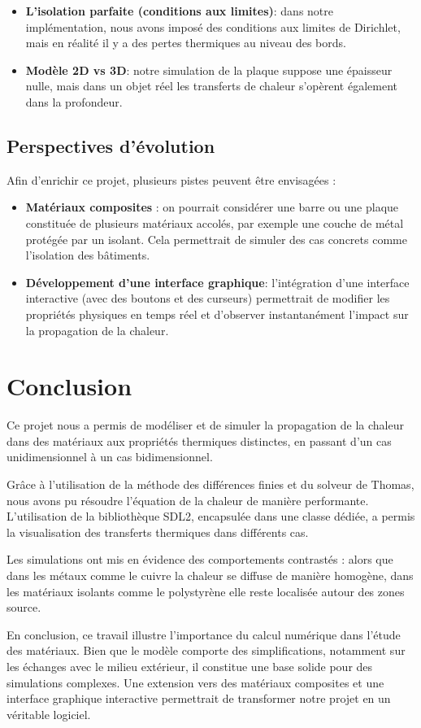 \documentclass[a4paper,12pt]{article}
\begin{document}
\begin{itemize}
\item \textbf{L'isolation parfaite (conditions aux limites)}: dans notre implémentation, nous avons imposé des conditions aux limites de Dirichlet, mais en réalité il y a des pertes thermiques au niveau des bords.
\item \textbf{Modèle 2D vs 3D}: notre simulation de la plaque suppose une épaisseur nulle, mais dans un objet réel les transferts de chaleur s'opèrent également dans la profondeur.
\end{itemize}

\subsection{Perspectives d'évolution}
Afin d'enrichir ce projet, plusieurs pistes peuvent être envisagées :

\begin{itemize}
\item \textbf{Matériaux composites} : on pourrait considérer une barre ou une plaque constituée de plusieurs matériaux accolés, par exemple une couche de métal protégée par un isolant. Cela permettrait de simuler des cas concrets comme l'isolation des bâtiments.
\item \textbf{Développement d'une interface graphique}: l'intégration d'une interface interactive (avec des boutons et des curseurs) permettrait de modifier les propriétés physiques en temps réel et d'observer instantanément l'impact sur la propagation de la chaleur.
\end{itemize}

\section{Conclusion}
Ce projet nous a permis de modéliser et de simuler la propagation de la chaleur dans des matériaux aux propriétés thermiques distinctes, en passant d'un cas unidimensionnel à un cas bidimensionnel.

Grâce à l'utilisation de la méthode des différences finies et du solveur de Thomas, nous avons pu résoudre l'équation de la chaleur de manière performante. L'utilisation de la bibliothèque SDL2, encapsulée dans une classe dédiée, a permis la visualisation des transferts thermiques dans différents cas.

Les simulations ont mis en évidence des comportements contrastés : alors que dans les métaux comme le cuivre la chaleur se diffuse de manière homogène, dans les matériaux isolants comme le polystyrène elle reste localisée autour des zones source.

En conclusion, ce travail illustre l'importance du calcul numérique dans l'étude des matériaux. Bien que le modèle comporte des simplifications, notamment sur les échanges avec le milieu extérieur, il constitue une base solide pour des simulations complexes. Une extension vers des matériaux composites et une interface graphique interactive permettrait de transformer notre projet en un véritable logiciel.
\end{document}
